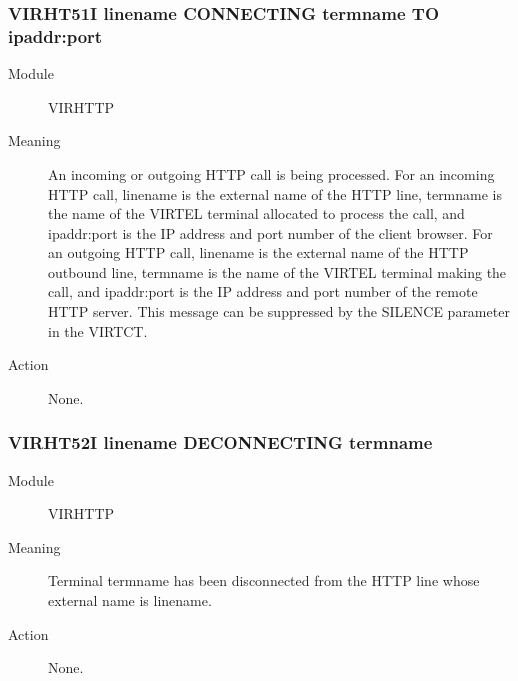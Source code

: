 \documentclass[letterpaper,10pt,english]{sphinxmanual}
\begin{document}
\subsubsection{VIRHT51I linename CONNECTING termname TO ipaddr:port}
\label{\detokenize{messages:virht51i-linename-connecting-termname-to-ipaddr-port}}\begin{description}
\item[{Module}] \leavevmode
VIRHTTP

\item[{Meaning}] \leavevmode
An incoming or outgoing HTTP call is being processed. For an incoming HTTP call, linename is the external name of the HTTP line, termname is the name of the VIRTEL terminal allocated to process the call, and ipaddr:port is the IP address and port number of the client browser. For an outgoing HTTP call, linename is the external name of the HTTP outbound line, termname is the name of the VIRTEL terminal making the call, and ipaddr:port is the IP address and port number of the remote HTTP server. This message can be suppressed by the SILENCE parameter in the VIRTCT.

\item[{Action}] \leavevmode
None.

\end{description}


\subsubsection{VIRHT52I linename DECONNECTING termname}
\label{\detokenize{messages:virht52i-linename-deconnecting-termname}}\begin{description}
\item[{Module}] \leavevmode
VIRHTTP

\item[{Meaning}] \leavevmode
Terminal termname has been disconnected from the HTTP line whose external name is linename.

\item[{Action}] \leavevmode
None.

\end{description}
\end{document}
